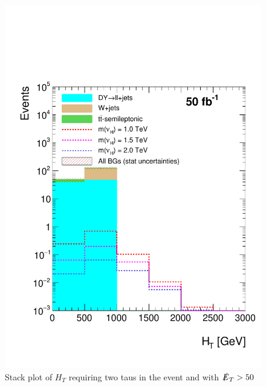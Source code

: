 \begin{figure}[H]
\centering
\includegraphics[width=\linewidth]{StackPlots/HT_2taus_met50_50ifb.pdf}
\caption{Stack plot of $H_{T}$ requiring two taus in the event and with $\slashed{E}_{T} > 50$}
\label{fig: HT2tausMet50}
\end{figure}

